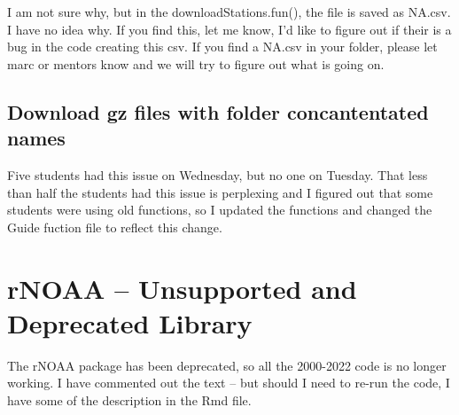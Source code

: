 \documentclass{article}\usepackage[]{graphicx}\usepackage[dvipsnames]{xcolor}
\begin{document}
I am not sure why, but in the downloadStations.fun(), the file is saved as NA.csv. I have no idea why. If you find this, let me know, I'd like to figure out if their is a bug in the code creating this csv.
If you find a NA.csv in your folder, please let marc or mentors know and we will try to figure out what is going on.

\subsection{Download gz files with folder concantentated names}

Five students had this issue on Wednesday, but no one on Tuesday. That less than half the students had this issue is perplexing and I figured out that some students were using old functions, so I updated the functions and changed the Guide fuction file to reflect this change. 

\section{rNOAA -- Unsupported and Deprecated Library}

The rNOAA package has been deprecated, so all the 2000-2022 code is no longer working. I have commented out the text -- but should I need to re-run the code, I have some of the description in the Rmd file. 




\end{document}
